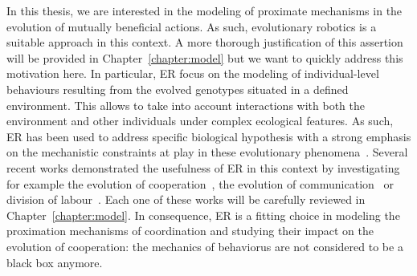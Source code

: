 

    In this thesis, we are interested in the modeling of proximate mechanisms in the evolution of mutually beneficial actions. As such, evolutionary robotics is a suitable approach in this context. A more thorough justification of this assertion will be provided in Chapter~\ref{chapter:model} but we want to quickly address this motivation here. In particular, ER focus on the modeling of individual-level behaviours resulting from the evolved genotypes situated in a defined environment. This allows to take into account interactions with both the environment and other individuals under complex ecological features. As such, ER has been used to address specific biological hypothesis with a strong emphasis on the mechanistic constraints at play in these evolutionary phenomena~\parencite{Floreano2010, Mitri2013}. Several recent works demonstrated the usefulness of ER in this context by investigating for example the evolution of cooperation~\parencite{Waibel2011, Waibel2009}, the evolution of communication~\parencite{Mitri2011, Wischmann2012} or division of labour~\parencite{Ferrante2015}. Each one of these works will be carefully reviewed in Chapter~\ref{chapter:model}. In consequence, ER is a fitting choice in modeling the proximation mechanisms of coordination and studying their impact on the evolution of cooperation: the mechanics of behaviorus are not considered to be a black box anymore.

